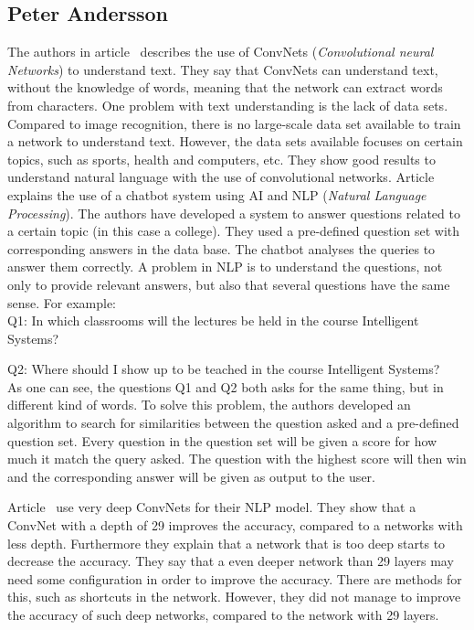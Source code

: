 \subsection{Peter Andersson}
The authors in article~\cite{DBLP:journals/corr/ZhangL15} describes the use of ConvNets (\textit{Convolutional neural Networks}) to understand text. They say that ConvNets can understand text, without the knowledge of words, meaning that the network can extract words from characters. One problem with text understanding is the lack of data sets. Compared to image recognition, there is no large-scale data set available to train a network to understand text. However, the data sets available focuses on certain topics, such as sports, health and computers, etc. They show good results to understand natural language with the use of convolutional networks.
\newline
Article~\cite{lalwani2018implementation} explains the use of a chatbot system using AI and NLP (\textit{Natural Language Processing}). The authors have developed a system to answer questions related to a certain topic (in this case a college). They used a pre-defined question set with corresponding answers in the data base. The chatbot analyses the queries to answer them correctly. A problem in NLP is to understand the questions, not only to provide relevant answers, but also that several questions have the same sense. For example:\\

Q1: In which classrooms will the lectures be held in the course Intelligent Systems?

Q2: Where should I show up to be teached in the course Intelligent Systems?\\

As one can see, the questions Q1 and Q2 both asks for the same thing, but in different kind of words. To solve this problem, the authors developed an algorithm to search for similarities between the question asked and a pre-defined question set. Every question in the question set will be given a score for how much it match the query asked. The question with the highest score will then win and the corresponding answer will be given as output to the user.

Article~\cite{conneau2016very} use very deep ConvNets for their NLP model. They show that a ConvNet with a depth of 29 improves the accuracy, compared to a networks with less depth. Furthermore they explain that a network that is too deep starts to decrease the accuracy. They say that a even deeper network than 29 layers may need some configuration in order to improve the accuracy. There are methods for this, such as shortcuts in the network. However, they did not manage to improve the accuracy of such deep networks, compared to the network with 29 layers.
